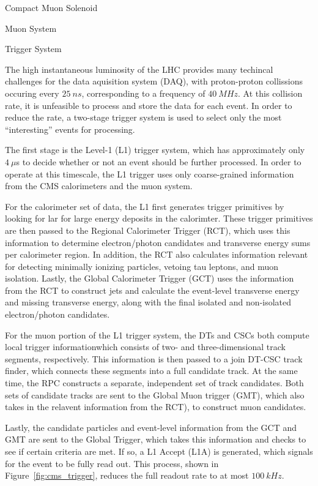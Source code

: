 \begin{section}{Compact Muon Solenoid}
\begin{subsection}{Muon System}
\end{subsection}

\begin{subsection}{Trigger System}

The high instantaneous luminosity of the LHC provides many techincal challenges for the data aquisition system (DAQ), with proton-proton collissions occuring every $25~ns$, corresponding to a frequency of $40~MHz$. 
At this collision rate, it is unfeasible to process and store the data for each event.
In order to reduce the rate, a two-stage trigger system is used to select only the most ``interesting'' events for processing.

The first stage is the Level-1 (L1) trigger system, which has approximately only $4~\mu$s to decide whether or not an event should be further processed. 
In order to operate at this timescale, the L1 trigger uses only coarse-grained information from the CMS calorimeters and the muon system.

For the calorimeter set of data, the L1 first generates trigger primitives by looking for lar for large energy deposits in the calorimter.
These trigger primitives are then passed to the Regional Calorimeter Trigger (RCT), which uses this information to determine electron/photon candidates and transverse energy sums per calorimeter region.
In addition, the RCT also calculates information relevant for detecting minimally ionizing particles, vetoing tau leptons, and muon isolation.
Lastly, the Global Calorimeter Trigger (GCT) uses the information from the RCT to construct jets and calculate the event-level transverse energy and missing transverse energy, along with the final isolated and non-isolated electron/photon candidates.

For the muon portion of the L1 trigger system, the DTs and CSCs both compute local trigger informationwhich consists of two- and three-dimensional track segments, respectively.
This information is then passed to a join DT-CSC track finder, which connects these segments into a full candidate track.
At the same time, the RPC constructs a separate, independent set of track candidates.
Both sets of candidate tracks are sent to the Global Muon trigger (GMT), which also takes in the relavent information from the RCT), to construct muon candidates.

Lastly, the candidate particles and event-level information from the GCT and GMT are sent to the Global Trigger, which takes this information and checks to see if certain criteria are met.
If so, a L1 Accept (L1A) is generated, which signals for the event to be fully read out.
This process, shown in Figure~\ref{fig:cms_trigger}, reduces the full readout rate to at most $100~kHz$.


\end{subsection}
\end{section}
